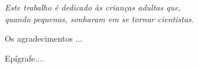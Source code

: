 \begin{dedicatoria}
   \vspace*{\fill}
   \centering
   \noindent
   \textit{ Este trabalho é dedicado às crianças adultas que,\\
   quando pequenas, sonharam em se tornar cientistas.} \vspace*{\fill}
\end{dedicatoria}

\begin{agradecimentos}
Os agradecimentos ...

\end{agradecimentos}

\begin{epigrafe}
    \vspace*{\fill}
	\begin{flushright}
	   Epígrafe....
	\end{flushright}
\end{epigrafe}
